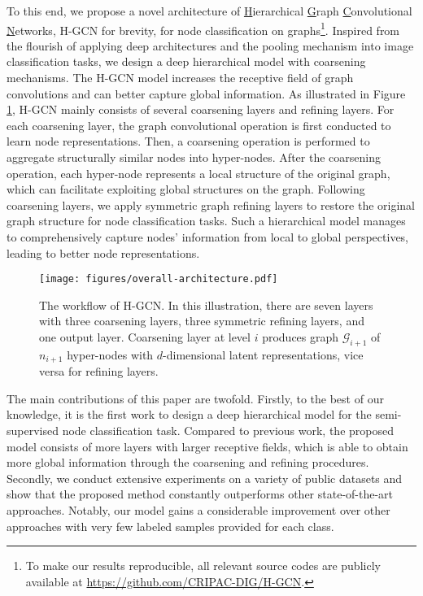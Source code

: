\documentclass{article}
\begin{document}
To this end, we propose a novel architecture of \underline{H}ierarchical \underline{G}raph \underline{C}onvolutional \underline{N}etworks, H-GCN for brevity, for node classification on graphs\footnote{To make our results reproducible, all relevant source codes are publicly available at \url{https://github.com/CRIPAC-DIG/H-GCN}.}. Inspired from the flourish of applying deep architectures and the pooling mechanism into image classification tasks, we design a deep hierarchical model with coarsening mechanisms. The H-GCN model increases the receptive field of graph convolutions and can better capture global information. As illustrated in Figure \ref{fig:workflow}, H-GCN mainly consists of several coarsening layers and refining layers. For each coarsening layer, the graph convolutional operation is first conducted to learn node representations. Then, a coarsening operation is performed to aggregate structurally similar nodes into hyper-nodes. After the coarsening operation, each hyper-node represents a local structure of the original graph, which can facilitate exploiting global structures on the graph. Following coarsening layers, we apply symmetric graph refining layers to restore the original graph structure for node classification tasks. Such a hierarchical model manages to comprehensively capture nodes' information from local to global perspectives, leading to better node representations.

\begin{figure}
	\centering
	\texttt{[image: figures/overall-architecture.pdf]}
	\caption{The workflow of H-GCN. In this illustration, there are seven layers with three coarsening layers, three symmetric refining layers, and one output layer. Coarsening layer at level $i$ produces graph $\mathcal{G}_{i+1}$ of $n_{i+1}$ hyper-nodes with $d$-dimensional latent representations, vice versa for refining layers.}
	\label{fig:workflow}
\end{figure}

The main contributions of this paper are twofold. Firstly, to the best of our knowledge, it is the first work to design a deep hierarchical model for the semi-supervised node classification task. Compared to previous work, the proposed model consists of more layers with larger receptive fields, which is able to obtain more global information through the coarsening and refining procedures. Secondly, we conduct extensive experiments on a variety of public datasets and show that the proposed method constantly outperforms other state-of-the-art approaches. Notably, our model gains a considerable improvement over other approaches with very few labeled samples provided for each class.
\end{document}
